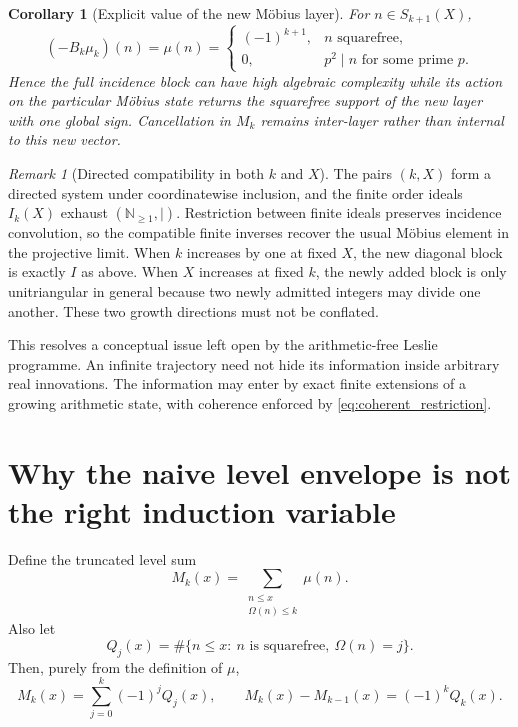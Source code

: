 \documentclass[11pt]{amsart}
\numberwithin{equation}{section}
\theoremstyle{plain}
\newtheorem{corollary}[theorem]{Corollary}
\theoremstyle{definition}
\theoremstyle{remark}
\newtheorem{remark}[theorem]{Remark}
\begin{document}
\begin{corollary}[Explicit value of the new M\"obius layer]
\label{cor:v9_explicit_new_layer}
For $n\in S_{k+1}(X)$,
\begin{equation}
(-B_k\mu_k)(n)=\mu(n)=
\begin{cases}
(-1)^{k+1},&n\text{ squarefree},\\
0,&p^2\mid n\text{ for some prime }p.
\end{cases}
\label{eq:v9_explicit_new_layer}
\end{equation}
Hence the full incidence block can have high algebraic complexity while its action on the
particular M\"obius state returns the squarefree support of the new layer with one global sign.
Cancellation in $M_k$ remains inter-layer rather than internal to this new vector.
\end{corollary}

\begin{remark}[Directed compatibility in both $k$ and $X$]
\label{rem:v9_projective_compatibility}
The pairs $(k,X)$ form a directed system under coordinatewise inclusion, and the finite order
ideals $I_k(X)$ exhaust $(\mathbb N_{\ge1},\mid)$.  Restriction between finite ideals preserves
incidence convolution, so the compatible finite inverses recover the usual M\"obius element in
the projective limit.  When $k$ increases by one at fixed $X$, the new diagonal block is exactly
$I$ as above.  When $X$ increases at fixed $k$, the newly added block is only unitriangular in
general because two newly admitted integers may divide one another.  These two growth directions
must not be conflated.
\end{remark}

This resolves a conceptual issue left open by the arithmetic-free Leslie programme.  An infinite
trajectory need not hide its information inside arbitrary real innovations.  The information may
enter by exact finite extensions of a growing arithmetic state, with coherence enforced by
\eqref{eq:coherent_restriction}.


\section{Why the naive level envelope is not the right induction variable}
\label{sec:omega_envelope_obstruction}

Define the truncated level sum
\begin{equation}
M_k(x)
=
\sum_{\substack{n\le x\\\Omega(n)\le k}}\mu(n).
\label{eq:Mk_level}
\end{equation}
Also let
\begin{equation}
Q_j(x)
=
\#\{n\le x:\ n\text{ is squarefree},\ \Omega(n)=j\}.
\label{eq:Qj_squarefree}
\end{equation}
Then, purely from the definition of $\mu$,
\begin{equation}
M_k(x)=
\sum_{j=0}^k(-1)^jQ_j(x),
\qquad
M_k(x)-M_{k-1}(x)=(-1)^kQ_k(x).
\label{eq:Mk_layer_decomposition}
\end{equation}
\end{document}
